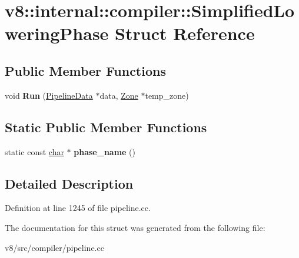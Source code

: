\hypertarget{structv8_1_1internal_1_1compiler_1_1SimplifiedLoweringPhase}{}\section{v8\+:\+:internal\+:\+:compiler\+:\+:Simplified\+Lowering\+Phase Struct Reference}
\label{structv8_1_1internal_1_1compiler_1_1SimplifiedLoweringPhase}
\subsection*{Public Member Functions}
\begin{DoxyCompactItemize}
\item 
\mbox{\label{structv8_1_1internal_1_1compiler_1_1SimplifiedLoweringPhase_ae3521a60fd5e1831c91c0092b92c80e9}} 
void {\bfseries Run} (\mbox{\hyperlink{classv8_1_1internal_1_1compiler_1_1PipelineData}{Pipeline\+Data}} $\ast$data, \mbox{\hyperlink{classv8_1_1internal_1_1Zone}{Zone}} $\ast$temp\+\_\+zone)
\end{DoxyCompactItemize}
\subsection*{Static Public Member Functions}
\begin{DoxyCompactItemize}
\item 
\mbox{\label{structv8_1_1internal_1_1compiler_1_1SimplifiedLoweringPhase_a15c384645f6402b82a8a8eefde9faad7}} 
static const \mbox{\hyperlink{classchar}{char}} $\ast$ {\bfseries phase\+\_\+name} ()
\end{DoxyCompactItemize}


\subsection{Detailed Description}


Definition at line 1245 of file pipeline.\+cc.



The documentation for this struct was generated from the following file\+:\begin{DoxyCompactItemize}
\item 
v8/src/compiler/pipeline.\+cc\end{DoxyCompactItemize}
